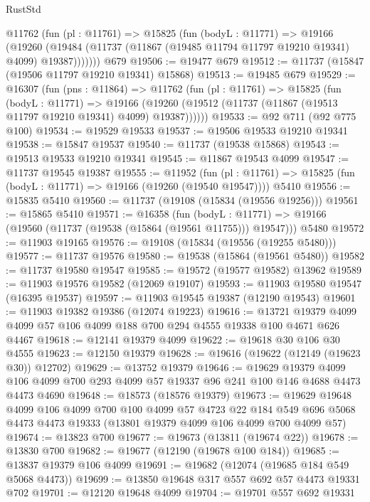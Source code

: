 \begin{lexlean}{RustStd}
\begin{coremodule}
      @11762
        (fun (pl : @11761) =>
        @15825
          (fun (bodyL : @11771) =>
          @19166
            (@19260
              (@19484 (@11737 (@11867 (@19485 @11794 @11797 @19210 @19341) @4099) @19387)))))))
    @679
@19506 := @19477 @679
@19512 := @11737 (@15847 (@19506 @11797 @19210 @19341) @15868)
@19513 := @19485 @679
@19529 := @16307
    (fun (pns : @11864) =>
    @11762
      (fun (pl : @11761) =>
      @15825
        (fun (bodyL : @11771) =>
        @19166 (@19260 (@19512 (@11737 (@11867 (@19513 @11797 @19210 @19341) @4099) @19387))))))
@19533 := @92 @711 (@92 @775 @100)
@19534 := @19529 @19533
@19537 := @19506 @19533 @19210 @19341
@19538 := @15847 @19537
@19540 := @11737 (@19538 @15868)
@19543 := @19513 @19533 @19210 @19341
@19545 := @11867 @19543 @4099
@19547 := @11737 @19545 @19387
@19555 := @11952
    (fun (pl : @11761) => @15825 (fun (bodyL : @11771) => @19166 (@19260 (@19540 @19547))))
    @5410
@19556 := @15835 @5410
@19560 := @11737 (@19108 (@15834 (@19556 @19256)))
@19561 := @15865 @5410
@19571 := @16358
    (fun (bodyL : @11771) => @19166 (@19560 (@11737 (@19538 (@15864 (@19561 @11755))) @19547)))
    @5480
@19572 := @11903 @19165
@19576 := @19108 (@15834 (@19556 (@19255 @5480)))
@19577 := @11737 @19576
@19580 := @19538 (@15864 (@19561 @5480))
@19582 := @11737 @19580 @19547
@19585 := @19572 (@19577 @19582) @13962
@19589 := @11903 @19576 @19582 (@12069 @19107)
@19593 := @11903 @19580 @19547 (@16395 @19537)
@19597 := @11903 @19545 @19387 (@12190 @19543)
@19601 := @11903 @19382 @19386 (@12074 @19223)
@19616 := @13721 @19379 @4099 @4099 @57 @106 @4099 @188 @700 @294 @4555 @19338 @100 @4671 @626 @4467
@19618 := @12141 @19379 @4099
@19622 := @19618 @30 @106 @30 @4555
@19623 := @12150 @19379
@19628 := @19616 (@19622 (@12149 (@19623 @30)) @12702)
@19629 := @13752 @19379
@19646 := @19629
    @19379
    @4099
    @106
    @4099
    @700
    @293
    @4099
    @57
    @19337
    @96
    @241
    @100
    @146
    @4688
    @4473
    @4473
    @4690
@19648 := @18573 (@18576 @19379)
@19673 := @19629
    @19648
    @4099
    @106
    @4099
    @700
    @100
    @4099
    @57
    @4723
    @22
    @184
    @549
    @696
    @5068
    @4473
    @4473
    @19333
    (@13801 @19379 @4099 @106 @4099 @700 @4099 @57)
@19674 := @13823 @700
@19677 := @19673 (@13811 (@19674 @22))
@19678 := @13830 @700
@19682 := @19677 (@12190 (@19678 @100 @184))
@19685 := @13837 @19379 @106 @4099
@19691 := @19682 (@12074 (@19685 @184 @549 @5068 @4473))
@19699 := @13850 @19648 @317 @557 @692 @57 @4473 @19331 @702
@19701 := @12120 @19648 @4099
@19704 := @19701 @557 @692 @19331

\end{coremodule}
\end{lexlean}
